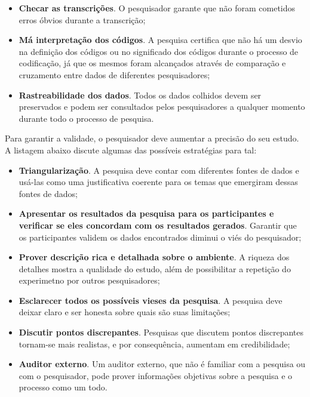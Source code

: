 \begin{itemize}
	\item \textbf{Checar as transcrições}. O pesquisador garante que não foram
	cometidos erros óbvios durante a transcrição;

	\item \textbf{Má interpretação dos códigos}. A pesquisa certifica que não há um
	desvio na definição dos códigos ou no significado dos códigos durante o processo 
	de codificação, já que os mesmos foram alcançados através de comparação e
	cruzamento entre dados de diferentes pesquisadores;
	
	\item \textbf{Rastreabilidade dos dados}. Todos os dados colhidos devem ser
	preservados e podem ser consultados pelos pesquisadores a qualquer momento
	durante todo o processo de pesquisa.

\end{itemize}

Para garantir a validade, o pesquisador deve aumentar a precisão do seu estudo.
A listagem abaixo discute algumas das possíveis estratégias para tal:

\begin{itemize}
	\item \textbf{Triangularização}. A pesquisa deve contar com diferentes fontes
	de dados e usá-las como uma justificativa coerente para os temas que emergiram
	dessas fontes de dados;

	\item \textbf{Apresentar os resultados da pesquisa para os participantes e
	verificar se eles concordam com os resultados gerados}. Garantir que os
	participantes validem os dados encontrados diminui o viés do pesquisador;

	\item \textbf{Prover descrição rica e detalhada sobre o ambiente}. A riqueza
	dos detalhes mostra a qualidade do estudo, além de possibilitar a repetição do
	experimetno por outros pesquisadores;

	\item \textbf{Esclarecer todos os possíveis vieses da pesquisa}. A pesquisa
	deve deixar claro e ser honesta sobre quais são suas limitações;
	
	\item \textbf{Discutir pontos discrepantes}. Pesquisas que discutem pontos
	discrepantes tornam-se mais realistas, e por consequência, aumentam em
	credibilidade;
	
	\item \textbf{Auditor externo}. Um auditor externo, que não é familiar com a
	pesquisa ou com o pesquisador, pode prover informações objetivas sobre a
	pesquisa e o processo como um todo.

\end{itemize} 
